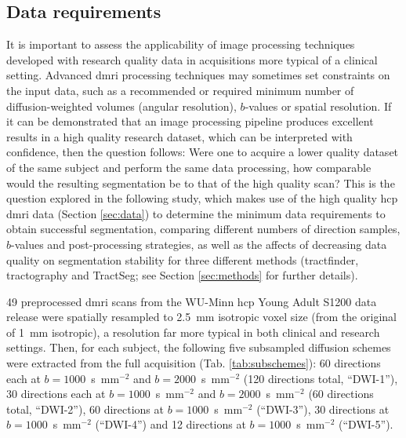 \subsection{Data requirements}\label{sec:ismrmdiff}

It is important to assess the applicability of image processing techniques developed with research quality data in acquisitions more typical of a clinical setting.
Advanced \gls{dmri} processing techniques may sometimes set constraints on the input data, such as a recommended or required minimum number of diffusion-weighted volumes (angular resolution), $b$-values or spatial resolution.
If it can be demonstrated that an image processing pipeline produces excellent results in a high quality research dataset, which can be interpreted with confidence, then the question follows:
Were one to acquire a lower quality dataset of the same subject and perform the same data processing, how comparable would the resulting segmentation be to that of the high quality scan?
This is the question explored in the following study, which makes use of the high quality \gls{hcp} \gls{dmri} data (Section \ref{sec:data}) to determine the minimum data requirements to obtain successful segmentation, comparing different numbers of direction samples, $b$-values and post-processing strategies, as well as the affects of decreasing data quality on segmentation stability for three different methods (tractfinder, tractography and TractSeg; see Section \ref{sec:methods} for further details).


49 preprocessed \gls{dmri} scans from the WU-Minn \gls{hcp} Young Adult S1200 data release were spatially resampled to 2.5~mm isotropic voxel size (from the original of 1~mm isotropic), a resolution far more typical in both clinical and research settings.
Then, for each subject, the following five subsampled diffusion schemes were extracted from the full acquisition (Tab. \ref{tab:subschemes}):
60 directions each at $b=1000$~s~mm$^{-2}$ and $b=2000$~s~mm$^{-2}$ (120 directions total, ``DWI-1”), 30 directions each at $b=1000$~s~mm$^{-2}$ and $b=2000$~s~mm$^{-2}$ (60 directions total, ``DWI-2”), 60 directions at $b=1000$~s~mm$^{-2}$ (``DWI-3”), 30 directions at $b=1000$~s~mm$^{-2}$ (``DWI-4”) and 12 directions at $b=1000$~s~mm$^{-2}$ (``DWI-5”).

